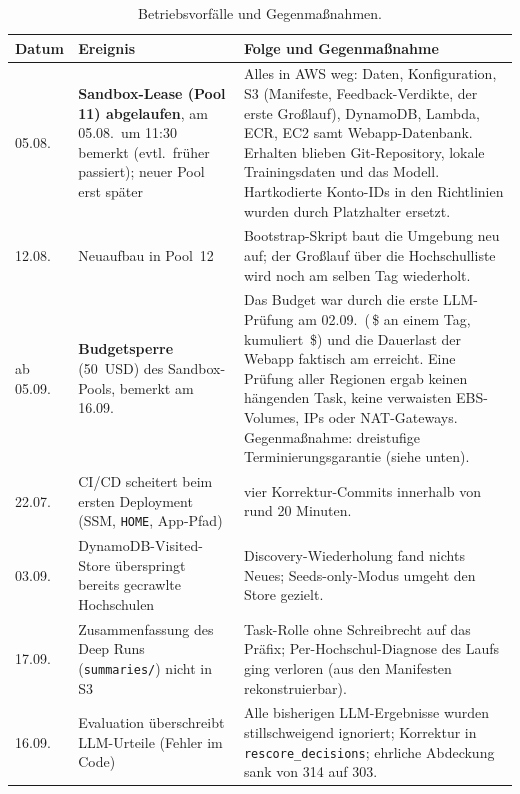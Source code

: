 \begin{table}[htbp]
\centering\small
\caption{Betriebsvorfälle und Gegenmaßnahmen.}\label{tab:vorfaelle}
\begin{tabularx}{\linewidth}{@{}p{2.0cm} p{3.6cm} X@{}}
\toprule
\textbf{Datum} & \textbf{Ereignis} & \textbf{Folge und Gegenmaßnahme} \\
\midrule
05.08. & \textbf{Sandbox-Lease (Pool 11) abgelaufen}, am 05.08.\ um 11:30 bemerkt (evtl.\ früher passiert); neuer Pool erst später & Alles in AWS weg: Daten, Konfiguration, S3 (Manifeste, Feedback-Verdikte, der erste Großlauf), DynamoDB, Lambda, ECR, EC2 samt Webapp-Datenbank. Erhalten blieben Git-Repository, lokale Trainingsdaten und das Modell. Hartkodierte Konto-IDs in den Richtlinien wurden durch Platzhalter ersetzt. \\
12.08. & Neuaufbau in Pool~12 & Bootstrap-Skript baut die Umgebung neu auf; der Großlauf über die Hochschulliste wird noch am selben Tag wiederholt. \\
ab 05.09. & \textbf{Budgetsperre} (50~USD) des Sandbox-Pools, bemerkt am 16.09. & Das Budget war durch die erste LLM-Prüfung am 02.09.\ (\zKostenSepTag{}\,\$ an einem Tag, kumuliert \zKostenSepKum{}\,\$) und die Dauerlast der Webapp faktisch am \zKostenTagGrenze{} erreicht. Eine Prüfung aller Regionen ergab keinen hängenden Task, keine verwaisten EBS-Volumes, IPs oder NAT-Gateways. Gegenmaßnahme: dreistufige Terminierungsgarantie (siehe unten). \\
22.07. & CI/CD scheitert beim ersten Deployment (SSM, \texttt{HOME}, App-Pfad) & vier Korrektur-Commits innerhalb von rund 20 Minuten. \\
03.09. & DynamoDB-Visited-Store überspringt bereits gecrawlte Hochschulen & Discovery-Wiederholung fand nichts Neues; Seeds-only-Modus umgeht den Store gezielt. \\
17.09. & Zusammenfassung des Deep Runs (\texttt{summaries/}) nicht in S3 & Task-Rolle ohne Schreibrecht auf das Präfix; Per-Hochschul-Diagnose des Laufs ging verloren (aus den Manifesten rekonstruierbar). \\
16.09. & Evaluation überschreibt LLM-Urteile (Fehler im Code) & Alle bisherigen LLM-Ergebnisse wurden stillschweigend ignoriert; Korrektur in \texttt{rescore\_decisions}; ehrliche Abdeckung sank von 314 auf 303. \\
\bottomrule
\end{tabularx}
\end{table}

